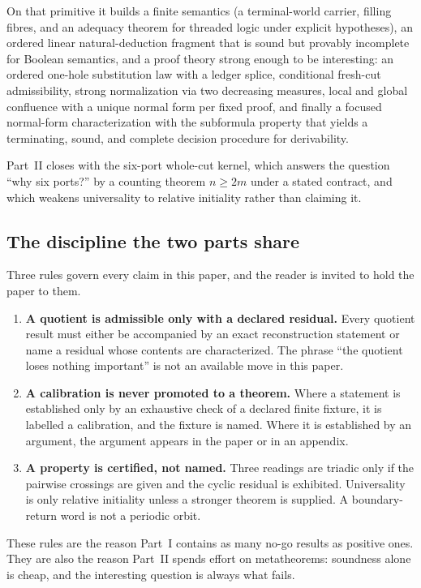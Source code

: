 On that primitive it builds a finite semantics (a terminal-world carrier, filling
fibres, and an adequacy theorem for threaded logic under explicit hypotheses), an
ordered linear natural-deduction fragment that is sound but provably incomplete for
Boolean semantics, and a proof theory strong enough to be interesting: an ordered
one-hole substitution law with a ledger splice, conditional fresh-cut admissibility,
strong normalization via two decreasing measures, local and global confluence with a
unique normal form per fixed proof, and finally a focused normal-form characterization
with the subformula property that yields a terminating, sound, and complete decision
procedure for derivability.

Part~II closes with the six-port whole-cut kernel, which answers the question ``why
six ports?'' by a counting theorem $n\ge 2m$ under a stated contract, and which
weakens universality to relative initiality rather than claiming it.

\subsection{The discipline the two parts share}

Three rules govern every claim in this paper, and the reader is invited to hold the
paper to them.

\begin{enumerate}
\item \textbf{A quotient is admissible only with a declared residual.}  Every
  quotient result must either be accompanied by an exact reconstruction statement or
  name a residual whose contents are characterized.  The phrase ``the quotient loses
  nothing important'' is not an available move in this paper.
\item \textbf{A calibration is never promoted to a theorem.}  Where a statement is
  established only by an exhaustive check of a declared finite fixture, it is
  labelled a calibration, and the fixture is named.  Where it is established by an
  argument, the argument appears in the paper or in an appendix.
\item \textbf{A property is certified, not named.}  Three readings are triadic only
  if the pairwise crossings are given and the cyclic residual is exhibited.
  Universality is only relative initiality unless a stronger theorem is supplied.
  A boundary-return word is not a periodic orbit.
\end{enumerate}

These rules are the reason Part~I contains as many no-go results as positive ones.
They are also the reason Part~II spends effort on metatheorems: soundness alone is
cheap, and the interesting question is always what fails.

